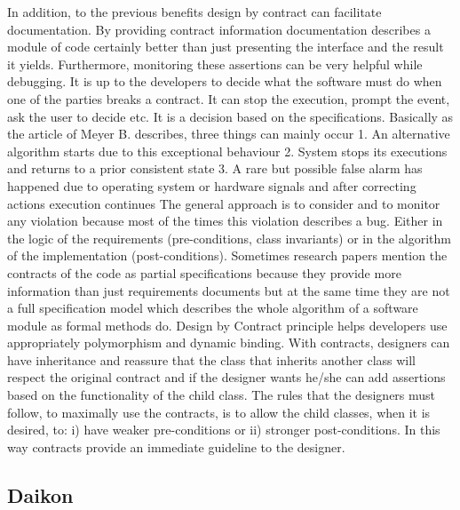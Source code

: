 {In addition, to the previous benefits design by contract can facilitate documentation. By providing contract information documentation describes a module of code certainly better than just presenting the interface and the result it yields. Furthermore, monitoring these assertions can be very helpful while debugging.
It is up to the developers to decide what the software must do when one of the parties breaks a contract. It can stop the execution, prompt the event, ask the user to decide etc. It is a decision based on the specifications. Basically as the article of Meyer B. \cite{meyer1992applying} describes, three things can mainly occur
1. An alternative algorithm starts due to this exceptional behaviour 2. System stops its executions and returns to a prior consistent state 3. A rare but possible false alarm has happened due to operating system or hardware signals and after correcting actions execution continues
The general approach is to consider and to monitor any violation because most of the times this violation describes a bug. Either in the logic of the requirements (pre-conditions, class invariants) or in the algorithm of the implementation (post-conditions).
Sometimes research papers mention the contracts of the code as partial specifications \cite{daniel2007automated} because they provide more information than just requirements documents but at the same time they are not a full specification model which describes the whole algorithm of a software module as formal methods do.
Design by Contract principle helps developers use appropriately polymorphism and dynamic binding. With contracts, designers can have inheritance and reassure that the class that inherits another class will respect the original contract and if the designer wants he/she can add assertions based on the functionality of the child class. The rules that the designers must follow, to maximally use the contracts, is to allow the child classes, when it is desired, to: i) have weaker pre-conditions or ii) stronger post-conditions. In this way contracts provide an immediate guideline to the designer.}


\subsection{Daikon} %

